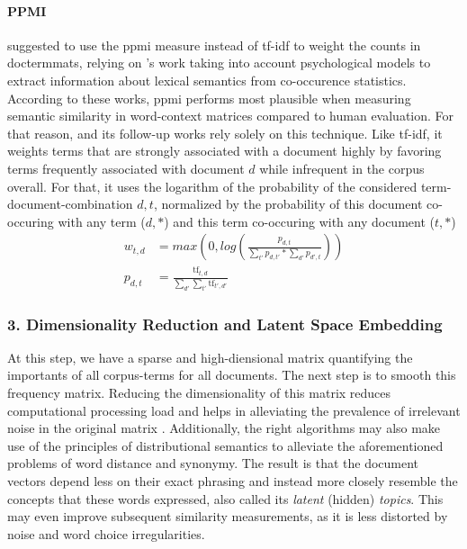 \paragraph{PPMI}

\textcite{Turney2010} suggested to use the \gls{ppmi} measure instead of \gls{tf-idf} to weight the counts in \glspl{doctermmat}, relying on \cite{Bullinaria2007}'s work taking into account psychological models to extract information about lexical semantics from co-occurence statistics. According to these works, \gls{ppmi} performs most plausible when measuring semantic similarity in word-context matrices compared to human evaluation. For that reason, \textcite{Derrac2015} and its follow-up works \cite{Ager2018,Alshaikh2020} rely solely on this technique. %
Like tf-idf, it weights terms that are strongly associated with a document highly by favoring terms frequently associated with document $d$ while infrequent in the corpus overall. For that, it uses the logarithm of the probability of the considered term-document-combination $d,t$, normalized by the probability of this document co-occuring with any term ($d,*$) and this term co-occuring with any document ($t,*$)
\vspace{-2.2ex}
\begin{align*}
   w_{t,d} &= max\left(0, log\left( \frac{p_{d,t}}{\sum_{t'}p_{d,t'}*\sum_{d'}p_{d',t}} \right) \right) \\
   p_{d,t} &= \frac{\text{tf}_{t,d}}{\sum_{d'}\sum_{t'} \text{tf}_{t',d'}}
\end{align*}


\subsubsection{3. Dimensionality Reduction and Latent Space Embedding}
\label{sec:dim_red}

At this step, we have a sparse and high-diensional matrix quantifying the importants of all corpus-terms for all documents. The next step is to smooth this frequency matrix. Reducing the dimensionality of this matrix reduces computational processing load and helps in alleviating the prevalence of irrelevant noise in the original matrix \cite{Turney2010}. Additionally, the right algorithms may also make use of the principles of distributional semantics to alleviate the aforementioned problems of word distance and synonymy. The result is that the document vectors depend less on their exact phrasing and instead more closely resemble the concepts that these words expressed, also called its \textit{latent} (hidden) \textit{topics}. This may even improve subsequent similarity measurements, as it is less distorted by noise and word choice irregularities.

